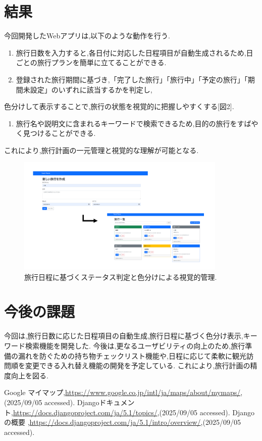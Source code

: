 \documentclass[a4j,twocolumn]{jsarticle}
\begin{document}
\section{結果}
\label{sec:org8a9ddac}
今回開発したWebアプリは,以下のような動作を行う.

\begin{enumerate}
\item 旅行日数を入力すると,各日付に対応した日程項目が自動生成されるため,日ごとの旅行プランを簡単に立てることができる.
\item 登録された旅行期間に基づき,「完了した旅行」「旅行中」「予定の旅行」「期間未設定」のいずれに該当するかを判定し,
\end{enumerate}
色分けして表示することで,旅行の状態を視覚的に把握しやすくする[図2].
\begin{enumerate}
\item 旅行名や説明文に含まれるキーワードで検索できるため,目的の旅行をすばやく見つけることができる.
\end{enumerate}
これにより,旅行計画の一元管理と視覚的な理解が可能となる.

\begin{figure}[htbp]
\centering
\includegraphics[width=10cm]{./figs/trip1.png}
\caption{\label{fig:org4451217}旅行日程に基づくステータス判定と色分けによる視覚的管理.}
\end{figure}


\section{今後の課題}
\label{sec:orgb874332}
今回は,旅行日数に応じた日程項目の自動生成,旅行日程に基づく色分け表示,キーワード検索機能を開発した.
今後は,更なるユーザビリティの向上のため,旅行準備の漏れを防ぐための持ち物チェックリスト機能や,日程に応じて柔軟に観光訪問順を変更できる入れ替え機能の開発を予定している.
これにより,旅行計画の精度向上を図る.


\small\setlength\baselineskip{10pt}
\begin{thebibliography}{9}

 Google マイマップ,\url{https://www.google.co.jp/intl/ja/maps/about/mymaps/},(2025/09/05 accessed).
Djangoドキュメント,\url{https://docs.djangoproject.com/ja/5.1/topics/},(2025/09/05 accessed).
Djangoの概要 ,\url{https://docs.djangoproject.com/ja/5.1/intro/overview/},(2025/09/05 accessed).
\end{thebibliography}
\end{document}
